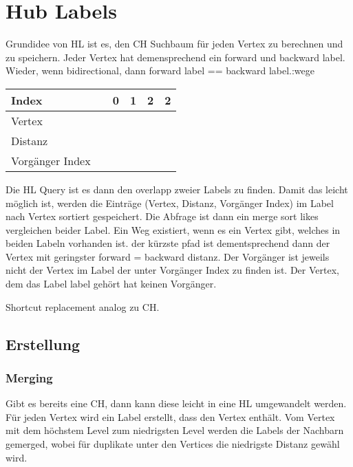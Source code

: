 \chapter{Hub Labels}\label{chapter:hl}

Grundidee von HL ist es, den CH Suchbaum für jeden Vertex zu berechnen und zu speichern.
Jeder Vertex hat demensprechend ein forward und backward label.
Wieder, wenn bidirectional, dann forward label == backward label.:wege


\begin{table}[]
    \centering
    \begin{tabular}{@{}llllll@{}}
        \toprule
        Index           &  & 0 & 1 & 2 & 2 \\ \midrule
        Vertex          &  &   &   &   &   \\
        Distanz         &  &   &   &   &   \\
        Vorgänger Index &  &   &   &   &   \\ \bottomrule
    \end{tabular}
\end{table}

Die HL Query ist es dann den overlapp zweier Labels zu finden.
Damit das leicht möglich ist, werden die Einträge (Vertex, Distanz, Vorgänger Index) im Label nach Vertex sortiert gespeichert.
Die Abfrage ist dann ein merge sort likes vergleichen beider Label. Ein Weg existiert, wenn es ein Vertex gibt, welches in beiden Labeln vorhanden ist.
der kürzste pfad ist dementsprechend dann der Vertex mit geringster forward = backward distanz.
Der Vorgänger ist jeweils nicht der Vertex im Label der unter Vorgänger Index zu finden ist. Der Vertex, dem das Label label gehört hat keinen Vorgänger.

Shortcut replacement analog zu CH.

\section{Erstellung}

\subsection{Merging}
Gibt es bereits eine CH, dann kann diese leicht in eine HL umgewandelt werden.
Für jeden Vertex wird ein Label erstellt, dass den Vertex enthält.
Vom Vertex mit dem höchstem Level zum niedrigsten Level werden die Labels der Nachbarn gemerged, wobei für duplikate unter den Vertices die niedrigste Distanz gewähl wird.

